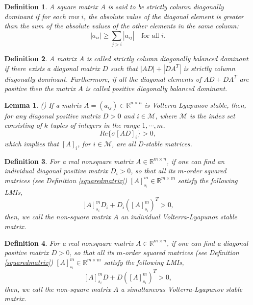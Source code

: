 \documentclass{article}
\newtheorem{lemma}{Lemma}
\newtheorem{definition}{Definition}
\begin{document}
\begin{definition} \cite{KUSHEL2021204}
A square matrix $A$ is said to be strictly column diagonally dominant if for each row $i$, the absolute value of the diagonal element is greater than the sum of the absolute values of the other elements in the same column:
\[
|a_{ii}| \geq \sum_{j > i} |a_{ij}| \quad \text{for all } i.
\]    
\end{definition}

\begin{definition}
A matrix $A$ is called strictly column diagonally balanced dominant if there exists a diagonal matrix $D$ such that $|AD| + |D A^T|$ is strictly column diagonally dominant. Furthermore, if all the diagonal elements of $AD + D A^T $ are positive then the matrix $A$ is called positive diagonally balanced dominant. 
\end{definition}

\begin{lemma} (\cite{Cross:-Thre}) \label{lemma2} 
If a matrix $A=(a_{ij}) \in \mathbb{R}^{n \times n}$ is Volterra-Lyapunov stable, then, for any diagonal positive matrix $D > 0$ and $i \in \mathcal{M}$, where $\mathcal{M}$ is the index set consisting of $k$ tuples of integers in the
range $1,\cdots, m$,
$$Re\{ \sigma [AD]_i \} >0,$$
which implies that $[A]_i$, for $i \in \mathcal{M}$,  are all D-stable matrices.
\end{lemma}

\begin{definition} \label{def_NSQ_lyp_ind}
For a real nonsquare matrix $A \in \mathbb{R}^{m \times n}$, if one can find an individual diagonal positive matrix  $D_i > 0$, so that all its $m$-order squared matrices (see Definition \ref{squaredmatrix}) $[A]^m_{s_i} \in \mathbb{R}^{m \times m}$  satisfy the following LMIs,
$$[A]^m_{s_i} D_i + D_i ([A]^m_{s_i})^T  > 0, $$
then, we call the non-square matrix $A$ an individual Volterra-Lyapunov stable matrix.
\end{definition}

\begin{definition} \label{def_NSQ_lyp}
For a real nonsquare matrix $A \in \mathbb{R}^{m \times n}$, if one can find a diagonal positive matrix  $D > 0$, so that all its $m$-order squared matrices (see Definition \ref{squaredmatrix}) $[A]^m_{s_i} \in \mathbb{R}^{m \times m}$  satisfy the following LMIs,
$$[A]^m_{s_i} D + D ([A]^m_{s_i})^T  > 0, $$
then, we call the non-square matrix $A$ a simultaneous Volterra-Lyapunov stable matrix.
\end{definition}
\end{document}

